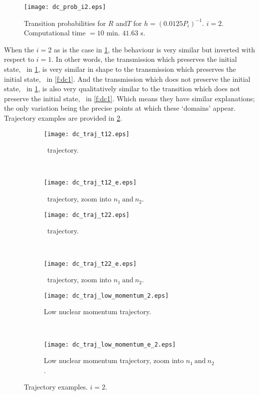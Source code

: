 \begin{figure}
\centering
\texttt{[image: dc\_prob\_i2.eps]}
\caption[Double avoided crossing. $ i = 2 $]{Transition probabilities for $ R $ and$ T $ for $ h = (0.0125P_{i})^{-1} $. $ i = 2 $. Computational time $ = 10$ min. $ 41.63 $ s.}
\label{f:dc2}
\end{figure}
When the $ i = 2 $ as is the case in \cref{f:dc2}, the behaviour is very similar but inverted with respect to $ i = 1 $. In other words, the transmission which preserves the initial state, \ttt~in \cref{f:dc2}, is very similar in shape to the transmission which preserves the initial state, \too~in \cref{f:dc1}. And the transmission which does not preserve the initial state, \tot~in \cref{f:dc2}, is also very qualitatively similar to the transition which does not preserve the initial state, \tto~in \cref{f:dc1}. Which means they have similar explanations; the only variation being the precise points at which these `domains' appear. Trajectory examples are provided in \cref{f:dc2t}.

\begin{figure}
\begin{subfigure}[t]{0.5\textwidth}
\centering
\texttt{[image: dc\_traj\_t12.eps]}
\caption[Double avoided crossing: \tot~trajectory.]{\tot~trajectory.}
\end{subfigure}
~
\begin{subfigure}[t]{0.5\textwidth}
\centering
\texttt{[image: dc\_traj\_t12\_e.eps]}
\caption[Double avoided crossing: \tot~trajectory, zoom into $ n_{1}~\text{and}~n_{2} $.]{\tot~trajectory, zoom into $ n_{1}~\text{and}~n_{2} $.}
\end{subfigure}

\begin{subfigure}[t]{0.5\textwidth}
\centering
\texttt{[image: dc\_traj\_t22.eps]}
\caption[Double avoided crossing: \ttt~trajectory.]{\ttt~trajectory.}
\end{subfigure}
~
\begin{subfigure}[t]{0.5\textwidth}
\centering
\texttt{[image: dc\_traj\_t22\_e.eps]}
\caption[Double avoided crossing: \ttt~trajectory, zoom into $ n_{1}~\text{and}~n_{2} $.]{\ttt~trajectory, zoom into $ n_{1}~\text{and}~n_{2} $.}
\end{subfigure}

\begin{subfigure}[t]{0.5\textwidth}
\centering
\texttt{[image: dc\_traj\_low\_momentum\_2.eps]}
\caption[Double avoided crossing: low nuclear momentum trajectory.]{Low nuclear momentum trajectory.}
\end{subfigure}
~
\begin{subfigure}[t]{0.5\textwidth}
\centering
\texttt{[image: dc\_traj\_low\_momentum\_e\_2.eps]}
\caption[Double avoided crossing: low nuclear momentum trajectory, zoom into $ n_{1}~\text{and}~n_{2} $.]{Low nuclear momentum trajectory, zoom into $ n_{1}~\text{and}~n_{2} $.}
\end{subfigure}
\caption[Double avoided crossing: trajectory examples. $ i = 2 $.]{Trajectory examples. $ i = 2 $.}
\label{f:dc2t}
\end{figure}
%
